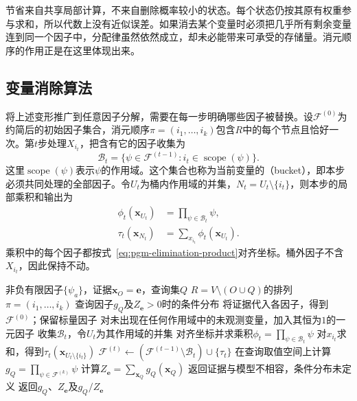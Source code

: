 节省来自共享局部计算，不来自删除概率较小的状态。每个状态仍按其原有权重参与求和，所以代数上没有近似误差。如果消去某个变量时必须把几乎所有剩余变量连到同一个因子中，分配律虽然依然成立，却未必能带来可承受的存储量。消元顺序的作用正是在这里体现出来。

\subsection{变量消除算法}
\label{sec:pgm-elimination-ve-algorithm}

将上述变形推广到任意因子分解，需要在每一步明确哪些因子被替换。设$\mathcal{F}^{(0)}$为约简后的初始因子集合，消元顺序$\pi=(i_1,\ldots,i_k)$包含$R$中的每个节点且恰好一次。第$t$步处理$X_{i_t}$，把含有它的因子收集为
\[
  \mathcal{B}_t
  =\{\psi\in\mathcal{F}^{(t-1)}:
      i_t\in\operatorname{scope}(\psi)\}.
\]
这里$\operatorname{scope}(\psi)$表示$\psi$的作用域。这个集合也称为当前变量的（bucket），即本步必须共同处理的全部因子。令$U_t$为桶内作用域的并集，$N_t=U_t\setminus\{i_t\}$，则本步的局部乘积和输出为
\begin{equation}
  \begin{aligned}
    \phi_t(\bm{x}_{U_t})&=\prod_{\psi\in\mathcal{B}_t}\psi,\\
    \tau_t(\bm{x}_{N_t})&=\sum_{x_{i_t}}\phi_t(\bm{x}_{U_t}).
  \end{aligned}
  \label{eq:pgm-elimination-local-sum}
\end{equation}
乘积中的每个因子都按式~\eqref{eq:pgm-elimination-product}对齐坐标。桶外因子不含$X_{i_t}$，因此保持不动。

\begin{algorithm}[离散边缘概率的变量消除]
  \label{alg:pgm-elimination-marginal}
  \begin{algorithmic}[1]
    \Require 非负有限因子$\{\psi_a\}$，证据$\bm{x}_O=\bm{e}$，查询集$Q$
    \Require $R=V\setminus(O\cup Q)$的排列$\pi=(i_1,\ldots,i_k)$
    \Ensure 查询因子$g_Q$及$Z_{\bm{e}}>0$时的条件分布
    \State 将证据代入各因子，得到$\mathcal{F}^{(0)}$；保留标量因子
    \State 对未出现在任何作用域中的未观测变量，加入其恒为$1$的一元因子
      \State 收集$\mathcal{B}_t$，令$U_t$为其作用域的并集
      \State 对齐坐标并求乘积$\phi_t=\prod_{\psi\in\mathcal{B}_t}\psi$
      \State 对$x_{i_t}$求和，得到$\tau_t(\bm{x}_{U_t\setminus\{i_t\}})$
      \State $\mathcal{F}^{(t)}\gets
        (\mathcal{F}^{(t-1)}\setminus\mathcal{B}_t)\cup\{\tau_t\}$
    \EndFor
    \State 在查询取值空间上计算$g_Q=\prod_{\psi\in\mathcal{F}^{(k)}}\psi$
    \State 计算$Z_{\bm{e}}=\sum_{\bm{x}_Q}g_Q(\bm{x}_Q)$
      \State 返回证据与模型不相容，条件分布未定义
    \Else
      \State 返回$g_Q$、$Z_{\bm{e}}$及$g_Q/Z_{\bm{e}}$
    \EndIf
  \end{algorithmic}
\end{algorithm}

